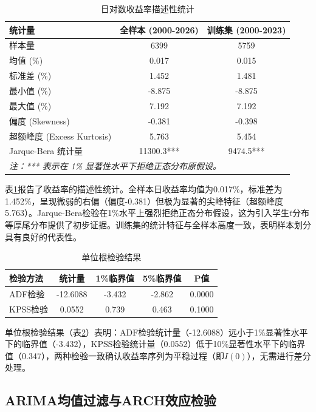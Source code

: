 \documentclass[12pt,a4paper]{ctexart}
\begin{document}
\begin{table}[htbp]
  \centering
  \caption{日对数收益率描述性统计}
  \label{tab:desc_stats}
  \begin{tabular}{lcc}
    \toprule
    统计量 & 全样本 (2000-2026) & 训练集 (2000-2023) \\
    \midrule
    样本量 & 6399 & 5759 \\
    均值 (\%) & 0.017 & 0.015 \\
    标准差 (\%) & 1.452 & 1.481 \\
    最小值 (\%) & -8.875 & -8.875 \\
    最大值 (\%) & 7.192 & 7.192 \\
    偏度 (Skewness) & -0.381 & -0.398 \\
    超额峰度 (Excess Kurtosis) & 5.763 & 5.454 \\
    Jarque-Bera 统计量 & 11300.3*** & 9474.5*** \\
    \bottomrule
    \multicolumn{3}{l}{\textit{注：*** 表示在 1\% 显著性水平下拒绝正态分布原假设。}}
  \end{tabular}
\end{table}

表\ref{tab:desc_stats}报告了收益率的描述性统计。全样本日收益率均值为0.017\%，标准差为1.452\%，呈现微弱的右偏（偏度-0.381）但极为显著的尖峰特征（超额峰度5.763）。Jarque-Bera检验在1\%水平上强烈拒绝正态分布假设，这为引入学生$t$分布等厚尾分布提供了初步证据。训练集的统计特征与全样本高度一致，表明样本划分具有良好的代表性。

\begin{table}[htbp]
  \centering
  \caption{单位根检验结果}
  \label{tab:unit_root}
  \begin{tabular}{lcccc}
    \toprule
    检验方法 & 统计量 & 1\%临界值 & 5\%临界值 & P值 \\
    \midrule
    ADF检验 & -12.6088 & -3.432 & -2.862 & 0.0000 \\
    KPSS检验 & 0.0552 & 0.739 & 0.463 & 0.1000 \\
    \bottomrule
  \end{tabular}
\end{table}

单位根检验结果（表\ref{tab:unit_root}）表明：ADF检验统计量（-12.6088）远小于1\%显著性水平下的临界值（-3.432），KPSS检验统计量（0.0552）低于10\%显著性水平下的临界值（0.347），两种检验一致确认收益率序列为平稳过程（即$I(0)$），无需进行差分处理。

\subsection{ARIMA均值过滤与ARCH效应检验}
\end{document}

